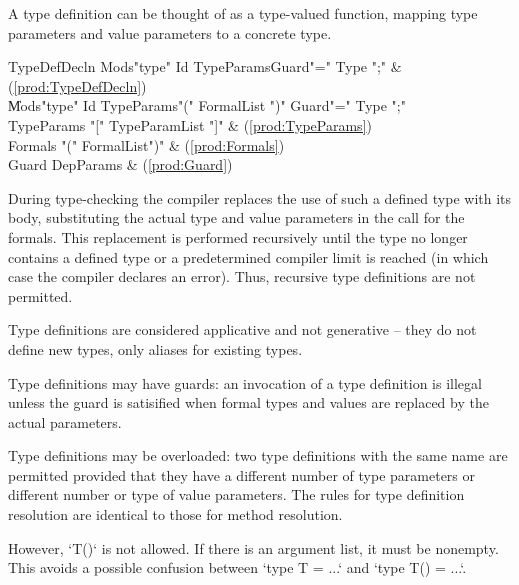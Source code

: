 A type definition can be thought of as a type-valued function,
mapping type parameters and value parameters to a concrete type.

\begin{bbgrammar}
        TypeDefDecln \: Mods\opt \xcd"type" Id TypeParams\opt Guard\opt \xcd"=" Type \xcd";" & (\ref{prod:TypeDefDecln}) \\
                     \| Mods\opt \xcd"type" Id TypeParams\opt \xcd"(" FormalList \xcd")" Guard\opt \xcd"=" Type \xcd";" \\
          TypeParams \: \xcd"[" TypeParamList \xcd"]" & (\ref{prod:TypeParams}) \\
             Formals \: \xcd"(" FormalList\opt \xcd")" & (\ref{prod:Formals}) \\
               Guard \: DepParams & (\ref{prod:Guard}) \\
\end{bbgrammar}

\noindent 
During type-checking the compiler replaces the use of such a defined
type with its body, substituting the actual type and value parameters
in the call for the formals. This replacement is performed recursively
until the type no longer contains a defined type or a predetermined
compiler limit is reached (in which case the compiler declares an
error). Thus, recursive type definitions are not permitted.

Type definitions are considered applicative and not generative --
they do not define new types, only aliases for existing types.

\label{TypeDefGuard}
Type definitions may have guards: an invocation of a type definition
is illegal unless the guard is satisified when formal types and values
are replaced by the actual parameters.

Type definitions may be overloaded: two type definitions with
the same name are permitted provided that they have a different number
of type parameters or different number or type of value parameters.  The rules
for type definition resolution are identical to those for method resolution.

However, \xcd`T()` is not allowed. If there is an argument list, it must be
nonempty.  This avoids a possible confusion between 
\xcd`type T = ...` and \xcd`type T() = ...`.  

